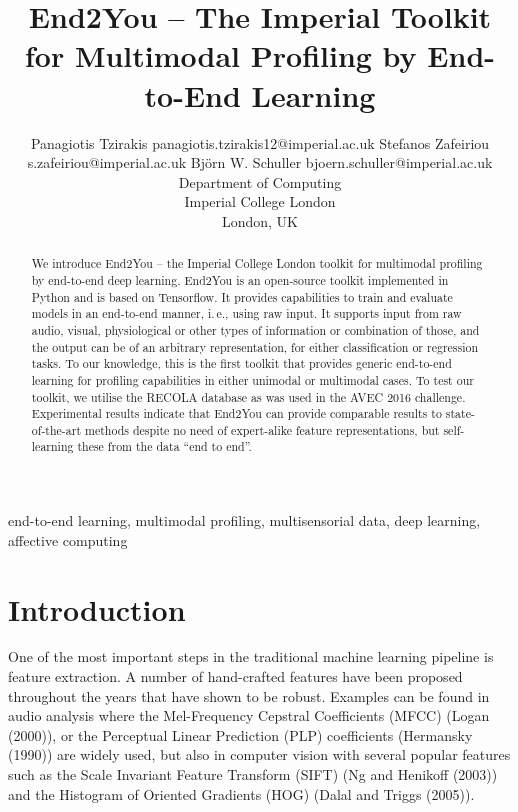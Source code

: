 \documentclass[twoside,11pt]{article}
\begin{document}
\title{End2You -- The Imperial Toolkit for Multimodal Profiling by End-to-End Learning}

\author{\name Panagiotis Tzirakis \email panagiotis.tzirakis12@imperial.ac.uk 
       \AND
       \name Stefanos Zafeiriou \email s.zafeiriou@imperial.ac.uk 
       \AND
       \name Bj\"orn W. Schuller \email bjoern.schuller@imperial.ac.uk \\
       \addr Department of Computing\\
       Imperial College London\\
       London, UK }

\maketitle

\begin{abstract}

We introduce End2You -- the Imperial College London toolkit for multimodal profiling by end-to-end deep learning. End2You is an open-source toolkit implemented in Python and is based on Tensorflow. It provides capabilities to train and evaluate models in an end-to-end manner, i.\,e., using raw input. It supports input from raw audio, visual, physiological or other types of  information or combination of those, and the output can be of an arbitrary representation, for either classification or regression tasks. To our knowledge, this is the first toolkit that provides generic end-to-end learning for profiling capabilities in either unimodal or multimodal cases. To test our toolkit, we utilise the RECOLA database as was used in the AVEC 2016 challenge. Experimental results indicate that End2You can provide comparable results to state-of-the-art methods despite no need of expert-alike feature representations, but self-learning these from the data ``end to end''.

\end{abstract}

\begin{keywords}
end-to-end learning, multimodal profiling, multisensorial data, deep learning, affective computing
\end{keywords}

\section{Introduction}

One of the most important steps in the traditional machine learning pipeline is feature extraction. A number of hand-crafted features have been proposed throughout the years that have shown to be robust. Examples can be found in audio analysis where the Mel-Frequency Cepstral Coefficients (MFCC) (Logan (2000)), or the Perceptual Linear Prediction (PLP) coefficients  (Hermansky (1990)) are widely used, but also in computer vision with several popular features such as the Scale Invariant Feature Transform (SIFT) (Ng and Henikoff (2003))  and the Histogram of Oriented Gradients (HOG) (Dalal and Triggs (2005)).
\end{document}
